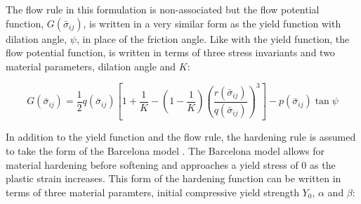 





The flow rule in this formulation is non-associated but the flow potential function, $G\left(\bar{\sigma}_{ij}\right)$, is written in a very similar form as the yield function with dilation angle, $\psi$, in place of the friction angle. Like with the yield function, the flow potential function, is written in terms of three stress invariants and two material parameters, dilation angle and $K$:

\begin{equation}
G\left(\bar{\sigma}_{ij}\right)=\frac{1}{2}q\left(\bar{\sigma}_{ij}\right)\left [ 1+\frac{1}{K}-\left ( 1-\frac{1}{K} \right )\left ( \frac{r\left(\bar{\sigma}_{ij}\right)}{q\left(\bar{\sigma}_{ij}\right)} \right )^3 \right ]-p\left(\bar{\sigma}_{ij}\right)\tan\psi\label{eqn:const11}
\end{equation}

In addition to the yield function and the flow rule, the hardening rule is assumed to take the form of the Barcelona model \cite{lubliner_plastic-damage_1989}. The Barcelona model allows for material hardening before softening and approaches a yield stress of 0 as the plastic strain increases.  This form of the hardening function can be written in terms of three material paramters, initial compressive yield strength $Y_0$, $\alpha$ and $\beta$:

